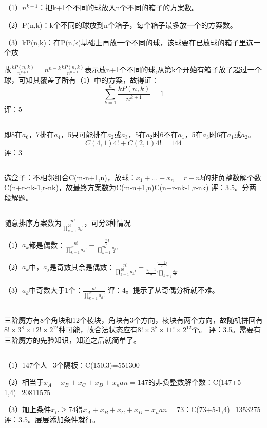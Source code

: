 \documentclass[fontset=windows]{article}
\begin{document}
\begin{sloppypar}
\subsection{}
（1）$n^{k+1}$：把k+1个不同的球放入n个不同的箱子的方案数。\par
（2）P(n,k)：k个不同的球放到n个箱子，每个箱子最多放一个的方案数。\par
（3）kP(n,k)：在P(n,k)基础上再放一个不同的球，该球要在已放球的箱子里选一个放\par
故$\frac{kP(n,k)}{n^{k+1}}=n^{n-k}\frac{kP(n,k)}{n^{n+1}}$表示放n+1个不同的球,从第k个开始有箱子放了超过一个球，可知其覆盖了所有（1）中的方案，故得证：
$$\sum_{k=1}^{n}{\frac{kP(n,k)}{n^{k+1}}}=1$$
评：5

\subsection{}
即8在$a_6$，7排在$a_4$，5只可能排在$a_2$或$a_3$，5在$a_2$时6不在$a_1$，5在$a_3$时6在$a_1$或$a_2$。
$$C(4,1)4!+C(2,1)4!=144$$
评：3

\subsection{}
选盒子：不相邻组合C(m-n+1,n)，放球：$x_1+...+x_n=r-nk$的非负整数解个数C(n+r-nk-1,r-nk)，故最终方案数为C(m-n+1,n)C(n+r-nk-1,r-nk)
评：3.5。分两段解题。

\subsection{}
随意排序方案数为$\frac{n!}{\prod\limits_{k=1}^{26}{a_k!}}$，可分3种情况 \par
（1）$a_k$都是偶数：$\frac{n!}{\prod\limits_{k=1}^{26}{a_k!}} - \frac{\frac{n}{2}!}{\prod\limits_{k=1}^{26}{\frac{a_k}{2}!}}$\par
（2）$a_k$中，$a_j$是奇数其余是偶数：$\frac{n!}{\prod\limits_{k=1}^{26}{a_k!}} - \frac{\frac{n-1}{2}!}{\frac{a_j-1}{2}!\prod\limits_{k \neq j}{\frac{a_k}{2}!}}$\par
（3）$a_k$中奇数大于1个：$\frac{n!}{\prod\limits_{k=1}^{26}{a_k!}}$
评：4。提示了从奇偶分析就不难。

\subsection{}
三阶魔方有8个角块和12个棱块，角块有3个方向，棱块有两个方向，故随机拼回有$8!\times3^8\times12!\times2^12$种可能，故合法状态应有$8!\times3^8\times11!\times2^{12}$个。
评：3.5。需要有三阶魔方的先验知识，知道之后就简单了。

\subsection{}
（1）147个人+3个隔板：C(150,3)=551300 \par
（2）相当于$x_A+x_B+x_C+x_D+x_nan=147$的非负整数解个数：C(147+5-1,4)=20811575\par
（3）加上条件$x_C\geq74$得$x_A+x_B+x_C+x_D+x_nan=73$：C(73+5-1,4)=1353275
评：3.5。层层添加条件就行。

\end{sloppypar}
\end{document}
